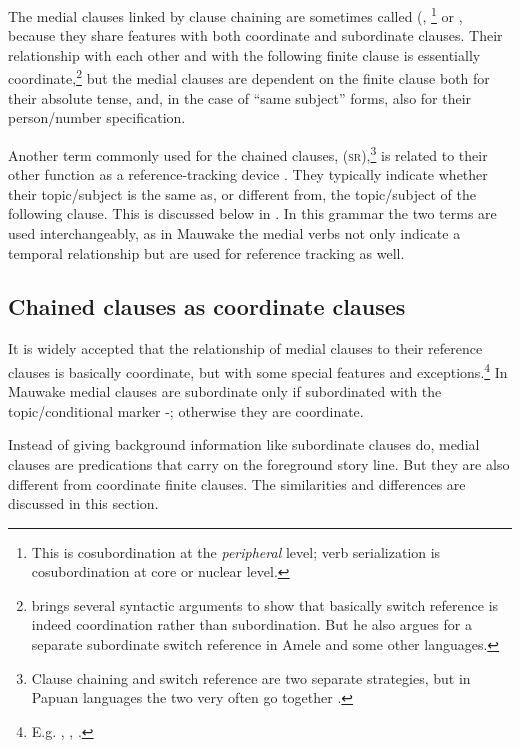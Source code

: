 The medial clauses linked by clause chaining are sometimes called  (\citealt{Olson1981}, \citealt[257]{FoleyEtAl1984} \footnote{This is cosubordination at the \textit{peripheral} level; verb serialization is cosubordination at core or nuclear level.} or  \citep[177]{Foley1986}, because they share features with both coordinate and subordinate clauses. Their relationship with each other and with the following finite clause is essentially coordinate,\footnote{\citet{Roberts1988a} brings several syntactic arguments to show that basically switch reference is indeed coordination rather than subordination. But he also argues for a separate subordinate switch reference in Amele and some other languages.} but the medial clauses are dependent on the finite clause both for their absolute tense, and, in the case of ``same subject'' forms, also for their person/number specification. 

Another term commonly used for the chained clauses,  (\textsc{sr}),\footnote{Clause chaining and switch reference are two separate strategies, but in Papuan languages the two very often  go together \citep[104]{Roberts1997}.} is related to their other function as a reference-tracking device \citep[ix]{HaimanEtAl1983}. They typically indicate whether their topic/subject is the same as, or different from, the topic/subject of the following clause. This is discussed below in . In this grammar the two terms are used interchangeably, as in Mauwake the medial verbs not only indicate a temporal relationship but are used for reference tracking as well.

\subsection{Chained clauses as coordinate clauses} \label{sec:8.2.1}

It is widely accepted that the relationship of medial clauses to their reference clauses is basically coordinate, but with some special features and exceptions.\footnote{E.g. \citet[175,193]{Reesink1987}, \citet[51]{Roberts1988a}, \citet[51,1997]{Roberts1988a}.} In Mauwake medial clauses are subordinate only if subordinated with the topic/conditional marker -; otherwise they are coordinate. 

Instead of giving background information like subordinate clauses do, medial clauses are predications that carry on the foreground story line. But they are also different from coordinate finite clauses. The similarities and differences are discussed in this section.

